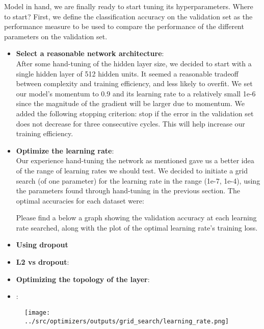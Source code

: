 Model in hand, we are finally ready to start tuning its hyperparameters. Where to start?
First, we define the classification accuracy on the validation set as
the performance measure to be used to compare the performance of the different parameters on the validation set.

\begin{itemize}
\item \textbf{Select a reasonable network architecture}:\\
  After some hand-tuning of the hidden layer size, we decided to start with a single hidden layer of 512 hidden units.
  It seemed a reasonable tradeoff between complexity and training efficiency, and less likely to overfit.
  We set our model's momentum to 0.9 and its learning rate to a relatively small 1e-6
  since the magnitude of the gradient will be larger due to momentum.
  We added the following stopping criterion: stop if the error in the validation set does not decrease for three consecutive cycles.
  This will help increase our training efficiency.

\item \textbf{Optimize the learning rate}:\\
  Our experience hand-tuning the network as mentioned gave us a better idea of the range of learning rates we should test.
  We decided to initiate a grid search (of one parameter) for the learning rate in the range (1e-7, 1e-4),
  using the parameters found through hand-tuning in the previous section.
  The optimal accuracies for each dataset were:
  
  Please find a below a graph showing the validation accuracy at each learning rate searched,
  along with the plot of the optimal learning rate's training loss. 

\item \textbf{Using dropout}\\


\item \textbf{L2 vs dropout}:\\

\item \textbf{Optimizing the topology of the layer}:\\  
  
\item {}:\\
\end{itemize}
  

\begin{figure}[!ht]
  \centering
      {{\texttt{[image: ../src/optimizers/outputs/grid\_search/learning\_rate.png]}}}
\end{figure}

